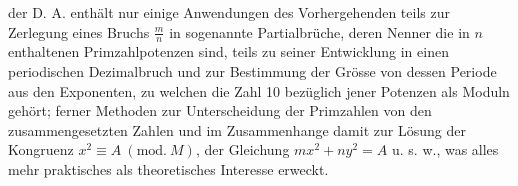  der D. A. enthält nur einige Anwendungen des Vorhergehenden teils zur Zerlegung eines Bruchs \(\frac{m}{n}\) in sogenannte Partialbrüche, deren Nenner die in \(n\) enthaltenen Primzahlpotenzen sind, teils zu seiner Entwicklung in einen periodischen Dezimalbruch und zur Bestimmung der Grösse von dessen Periode aus den Exponenten, zu welchen die Zahl 10 bezüglich jener Potenzen als Moduln gehört; ferner Methoden zur Unterscheidung der Primzahlen von den zusammengesetzten Zahlen und im Zusammenhange damit zur Lösung der Kongruenz \(x^2\equiv A\ (\mathrm{mod.}\ M)\), der Gleichung \(mx^2+ny^2=A\) u. s. w., was alles mehr praktisches als theoretisches Interesse erweckt.
